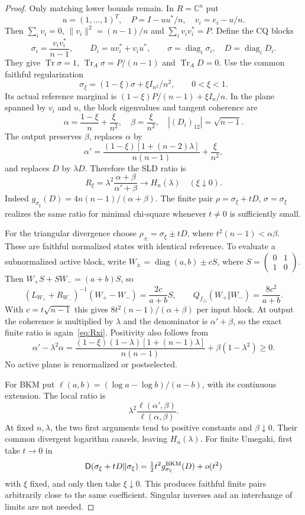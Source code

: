 \documentclass[11pt]{article}
\theoremstyle{remark}\newtheorem{remark}[theorem]{Remark}
\newcommand{\Tr}{\operatorname{Tr}}
\newcommand{\diag}{\operatorname{diag}}
\newcommand{\D}{\mathsf D}
\begin{document}
\begin{proof}
Only matching lower bounds remain. In $R=\mathbb C^n$ put
\[
 u=(1,\ldots,1)^T,\quad P=I-uu^*/n,\quad v_i=e_i-u/n.
\]
Then $\sum_iv_i=0$, $\|v_i\|^2=(n-1)/n$ and $\sum_iv_iv_i^*=P$. Define the CQ blocks
\[
 \sigma_i=\frac{v_iv_i^*}{n-1},\qquad D_i=uv_i^*+v_iu^*,\qquad
 \sigma=\diag_i\sigma_i,\quad D=\diag_iD_i.
\]
They give $\Tr\sigma=1$, $\Tr_A\sigma=P/(n-1)$ and $\Tr_A D=0$. Use the common faithful regularization
\[
 \sigma_\xi=(1-\xi)\sigma+\xi I_{n^2}/n^2,
 \qquad 0<\xi<1.
\]
Its actual reference marginal is $(1-\xi)P/(n-1)+\xi I_n/n$. In the plane spanned by $v_i$ and $u$, the block eigenvalues and tangent coherence are
\[
 \alpha=\frac{1-\xi}{n}+\frac\xi{n^2},\quad
 \beta=\frac\xi{n^2},\quad |(D_i)_{12}|=\sqrt{n-1}.
\]
The output preserves $\beta$, replaces $\alpha$ by
\begin{equation}\label{eq:alphaout}
 \alpha'=\frac{(1-\xi)[1+(n-2)\lambda]}{n(n-1)}+\frac\xi{n^2},
\end{equation}
and replaces $D$ by $\lambda D$. Therefore the SLD ratio is
\begin{equation}\label{eq:Rxi}
 R_\xi=\lambda^2\frac{\alpha+\beta}{\alpha'+\beta}
 \longrightarrow H_n(\lambda)\quad(\xi\downarrow0).
\end{equation}
Indeed $g_{\sigma_\xi}(D)=4n(n-1)/(\alpha+\beta)$. The finite pair $\rho=\sigma_\xi+tD$, $\sigma=\sigma_\xi$ realizes the same ratio for minimal chi-square whenever $t\ne0$ is sufficiently small.

For the triangular divergence choose $\rho_\pm=\sigma_\xi\pm tD$, where $t^2(n-1)<\alpha\beta$. These are faithful normalized states with identical reference. To evaluate a subnormalized active block, write $W_\pm=\diag(a,b)\pm cS$, where $S=\left(\begin{smallmatrix}0&1\\1&0\end{smallmatrix}\right)$. Then $W_+S+SW_-=(a+b)S$, so
\[
 (L_{W_+}+R_{W_-})^{-1}(W_+-W_-)=\frac{2c}{a+b}S,
 \qquad Q_{f_\triangle}(W_+\Vert W_-)=\frac{8c^2}{a+b}.
\]
With $c=t\sqrt{n-1}$ this gives $8t^2(n-1)/(\alpha+\beta)$ per input block. At output the coherence is multiplied by $\lambda$ and the denominator is $\alpha'+\beta$, so the exact finite ratio is again~\eqref{eq:Rxi}. Positivity also follows from
\[
 \alpha'-\lambda^2\alpha=
 \frac{(1-\xi)(1-\lambda)[1+(n-1)\lambda]}{n(n-1)}
 +\beta(1-\lambda^2)\geq0.
\]
No active plane is renormalized or postselected.

For BKM put $\ell(a,b)=(\log a-\log b)/(a-b)$, with its continuous extension. The local ratio is
\[
 \lambda^2\frac{\ell(\alpha',\beta)}{\ell(\alpha,\beta)}.
\]
At fixed $n,\lambda$, the two first arguments tend to positive constants and $\beta\downarrow0$. Their common divergent logarithm cancels, leaving $H_n(\lambda)$. For finite Umegaki, first take $t\to0$ in
\[
 \D(\sigma_\xi+tD\Vert\sigma_\xi)
 =\tfrac12t^2g^{\rm BKM}_{\sigma_\xi}(D)+o(t^2)
\]
with $\xi$ fixed, and only then take $\xi\downarrow0$. This produces faithful finite pairs arbitrarily close to the same coefficient. Singular inverses and an interchange of limits are not needed.
\end{proof}
\end{document}
